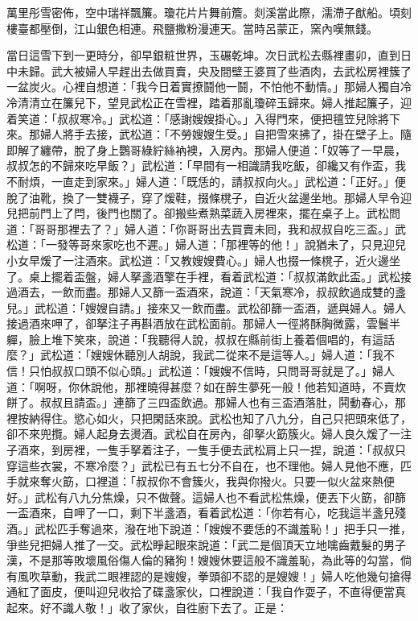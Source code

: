 \begin{myquote}
萬里彤雪密佈，空中瑞祥飄簾。瓊花片片舞前簷。剡溪當此際，濡滯子猷船。頃刻樓臺都壓倒，江山銀色相連。飛鹽撒粉漫連天。當時呂蒙正，窯內嘆無錢。
\end{myquote}

當日這雪下到一更時分，卻早銀粧世界，玉碾乾坤。次日武松去縣裡畫卯，直到日中未歸。武大被婦人早趕出去做買賣，央及間壁王婆買了些酒肉，{}去武松房裡簇了一盆炭火。心裡自想道：「我今日着實撩鬪他一鬪，不怕他不動情。」那婦人獨自冷冷清清立在簾兒下，望見武松正在雪裡，踏着那亂瓊碎玉歸來。婦人推起簾子，迎着笑道：「叔叔寒冷。」武松道：「感謝嫂嫂掛心。」入得門來，便把氊笠兒除將下來。那婦人將手去接，武松道：「不勞嫂嫂生受。」自把雪來拂了，{}掛在壁子上。隨即解了纏帶，脫了身上鸚哥綠紵絲衲襖，入房內。那婦人便道：「奴等了一早晨，叔叔怎的不歸來吃早飯？」武松道：「早間有一相識請我吃飯，卻纔又有作盃，我不耐煩，一直走到家來。」婦人道：「既恁的，請叔叔向火。」武松道：「正好。」便脫了油靴，換了一雙襪子，穿了煖鞋，掇條櫈子，自近火盆邊坐地。{}那婦人早令迎兒把前門上了閂，後門也關了。卻搬些煮熟菜蔬入房裡來，擺在桌子上。武松問道：「哥哥那裡去了？」婦人道：「你哥哥出去買賣未囘，我和叔叔自吃三盃。」武松道：「一發等哥來家吃也不遲。」婦人道：「那裡等的他！」說猶未了，只見迎兒小女早煖了一注酒來。武松道：「又教嫂嫂費心。」婦人也掇一條櫈子，近火邊坐了。桌上擺着盃盤，婦人拏盞酒擎在手裡，看着武松道：「叔叔滿飲此盃。」武松接過酒去，一飲而盡。那婦人又篩一盃酒來，說道：「天氣寒冷，叔叔飲過成雙的盞兒。」{}武松道：「嫂嫂自請。」接來又一飲而盡。武松卻篩一盃酒，遞與婦人。婦人接過酒來呷了，卻拏注子再斟酒放在武松面前。那婦人一徑將酥胸微露，雲鬟半軃，{}臉上堆下笑來，說道：「我聽得人說，叔叔在縣前街上養着個唱的，有這話麼？」{}武松道：「嫂嫂休聽別人胡說，我武二從來不是這等人。」{}婦人道：「我不信！只怕叔叔口頭不似心頭。」武松道：「嫂嫂不信時，只問哥哥就是了。」婦人道：「啊呀，你休說他，那裡曉得甚麼？{}如在醉生夢死一般！{}他若知道時，不賣炊餅了。叔叔且請盃。」連篩了三四盃飲過。那婦人也有三盃酒落肚，鬨動春心，那裡按納得住。慾心如火，只把閑話來說。武松也知了八九分，自己只把頭來低了，卻不來兜攬。婦人起身去燙酒。武松自在房內，卻拏火筯簇火。{}婦人良久煖了一注子酒來，到房裡，一隻手拏着注子，一隻手便去武松肩上只一捏，說道：「叔叔只穿這些衣裳，不寒冷麼？」武松已有五七分不自在，也不理他。{}婦人見他不應，匹手就來奪火筯，口裡道：「叔叔你不會簇火，我與你撥火。只要一似火盆來熱便好。」武松有八九分焦燥，只不做聲。這婦人也不看武松焦燥，{}便丟下火筯，卻篩一盃酒來，自呷了一口，剩下半盞酒，看着武松道：「你若有心，吃我這半盞兒殘酒。」武松匹手奪過來，{}潑在地下說道：「嫂嫂不要恁的不識羞恥！」{}把手只一推，爭些兒把婦人推了一交。{}武松睜起眼來說道：「武二是個頂天立地噙齒戴髮的男子漢，不是那等敗壞風俗傷人倫的豬狗！{}嫂嫂休要這般不識羞恥，為此等的勾當，倘有風吹草動，我武二眼裡認的是嫂嫂，拳頭卻不認的是嫂嫂！」{}婦人吃他幾句搶得通紅了面皮，便叫迎兒收拾了碟盞家伙，{}口裡說道：「我自作耍子，不直得便當真起來。好不識人敬！」{}收了家伙，自徃廚下去了。正是：

